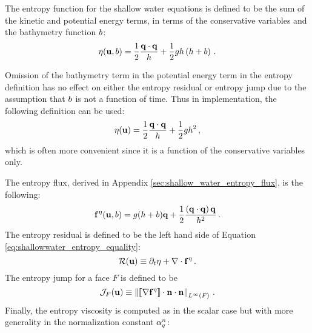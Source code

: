The entropy function for the shallow water equations is defined to be
the sum of the kinetic and potential energy terms, in terms of the
conservative variables and the bathymetry function $b$:
\begin{equation}
  \eta(\mathbf{u},b)
  = \frac{1}{2}\frac{\mathbf{q}\cdot\mathbf{q}}
  {h} + \frac{1}{2}gh\left(h+b\right)
  \,.
\end{equation}
\begin{remark}
Omission of the bathymetry term in the potential energy
term in the entropy definition has no effect on either the entropy
residual or entropy jump due to the assumption that $b$ is
not a function of time. Thus in implementation, the following definition
can be used:
\begin{equation}
  \eta(\mathbf{u})
  = \frac{1}{2}\frac{\mathbf{q}\cdot\mathbf{q}}
  {h} + \frac{1}{2}gh^2
  \,,
\end{equation}
which is often more convenient since it is a function of the conservative
variables only.
\end{remark}
The entropy flux, derived in Appendix \ref{sec:shallow_water_entropy_flux}, is the
following:
\begin{equation}
  \mathbf{f}^\eta(\mathbf{u},b)
  = g(h + b)\mathbf{q}
  + \frac{1}{2}\frac{\left(\mathbf{q}\cdot\mathbf{q}\right)\mathbf{q}} 
  {h^2}
  \,.
\end{equation}
The entropy residual is defined to be the left hand side of 
Equation \eqref{eq:shallowwater_entropy_equality}:
\begin{equation}
  \mathcal{R}(\mathbf{u}) \equiv \partial_t\eta
  + \nabla\cdot\mathbf{f}^\eta
  \,.
\end{equation}
The entropy jump for a face $F$ is defined to be
\begin{equation}
  \mathcal{J}_F(\mathbf{u})
  \equiv \left\|
    \left\llbracket\nabla\mathbf{f}^\eta\right\rrbracket
    \cdot\mathbf{n}\cdot\mathbf{n}
  \right\|_{L^\infty(F)} \,.
\end{equation}
Finally, the entropy viscosity is computed as in the scalar case but with
more generality in the normalization constant $\alpha^n_q$:

